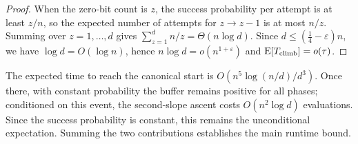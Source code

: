 \begin{proof}
	When the zero-bit count is $z$, the success probability per attempt is at least $z/n$, so the expected number of attempts for $z\!\to\! z-1$ is at most $n/z$.
	Summing over $z=1,\dots,d$ gives $\sum_{z=1}^{d}n/z=\Theta(n\log d)$.
	Since $d\le(\tfrac14-\varepsilon)n$, we have $\log d=O(\log n)$, hence $n\log d=o(n^{1+\varepsilon})$ and $\text{E}[T_{\mathrm{climb}}]=o(\tau)$.
\end{proof}


The expected time to reach the canonical start is 
$O(n^{5}\log(n/d)/d^{3})$.  
Once there, with constant probability the buffer remains positive for all 
phases; conditioned on this event, the second-slope ascent costs 
$O(n^{2}\log d)$ evaluations.  
Since the success probability is constant, this remains the unconditional 
expectation.  
Summing the two contributions establishes the main runtime bound.

